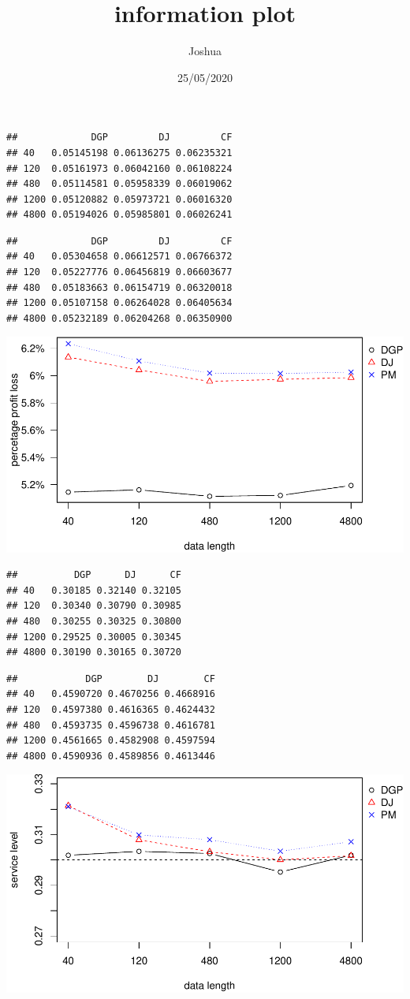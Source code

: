 \documentclass[
]{article}
\title{information plot}
\author{Joshua}
\date{25/05/2020}
\begin{document}
\maketitle

\begin{verbatim}
##             DGP         DJ         CF
## 40   0.05145198 0.06136275 0.06235321
## 120  0.05161973 0.06042160 0.06108224
## 480  0.05114581 0.05958339 0.06019062
## 1200 0.05120882 0.05973721 0.06016320
## 4800 0.05194026 0.05985801 0.06026241
\end{verbatim}

\begin{verbatim}
##             DGP         DJ         CF
## 40   0.05304658 0.06612571 0.06766372
## 120  0.05227776 0.06456819 0.06603677
## 480  0.05183663 0.06154719 0.06320018
## 1200 0.05107158 0.06264028 0.06405634
## 4800 0.05232189 0.06204268 0.06350900
\end{verbatim}

\includegraphics{information-plot_files/figure-latex/AR(1)ppl-1.pdf}

\begin{verbatim}
##          DGP      DJ      CF
## 40   0.30185 0.32140 0.32105
## 120  0.30340 0.30790 0.30985
## 480  0.30255 0.30325 0.30800
## 1200 0.29525 0.30005 0.30345
## 4800 0.30190 0.30165 0.30720
\end{verbatim}

\begin{verbatim}
##            DGP        DJ        CF
## 40   0.4590720 0.4670256 0.4668916
## 120  0.4597380 0.4616365 0.4624432
## 480  0.4593735 0.4596738 0.4616781
## 1200 0.4561665 0.4582908 0.4597594
## 4800 0.4590936 0.4589856 0.4613446
\end{verbatim}

\includegraphics{information-plot_files/figure-latex/AR(1)sl-1.pdf}
\end{document}
